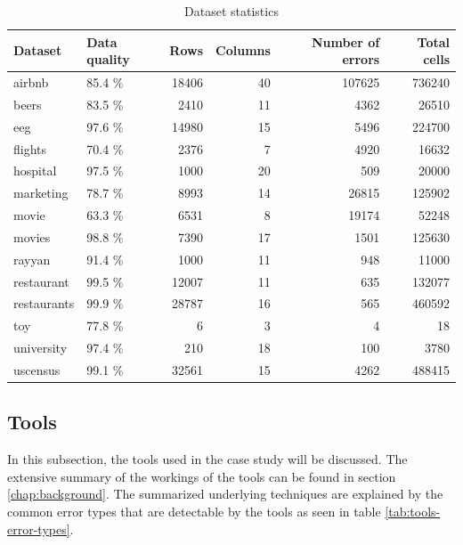 \begin{table}
\begin{tabular}{llrrrr}
\toprule
     Dataset & Data quality &   Rows &  Columns &  Number of errors &  Total cells \\
\midrule
      airbnb &       85.4 \% &  18406 &       40 &            107625 &       736240 \\
       beers &       83.5 \% &   2410 &       11 &              4362 &        26510 \\
         eeg &       97.6 \% &  14980 &       15 &              5496 &       224700 \\
     flights &       70.4 \% &   2376 &        7 &              4920 &        16632 \\
    hospital &       97.5 \% &   1000 &       20 &               509 &        20000 \\
   marketing &       78.7 \% &   8993 &       14 &             26815 &       125902 \\
       movie &       63.3 \% &   6531 &        8 &             19174 &        52248 \\
      movies &       98.8 \% &   7390 &       17 &              1501 &       125630 \\
      rayyan &       91.4 \% &   1000 &       11 &               948 &        11000 \\
  restaurant &       99.5 \% &  12007 &       11 &               635 &       132077 \\
 restaurants &       99.9 \% &  28787 &       16 &               565 &       460592 \\
         toy &       77.8 \% &      6 &        3 &                 4 &           18 \\
  university &       97.4 \% &    210 &       18 &               100 &         3780 \\
    uscensus &       99.1 \% &  32561 &       15 &              4262 &       488415 \\
\bottomrule
\end{tabular}
\caption{Dataset statistics}
\label{tab:dataset_statistics}
\end{table}

\subsection{Tools}
\label{subsec:tools}
In this subsection, the tools used in the case study will be discussed. The extensive summary of the workings of the tools can be found in section \ref{chap:background}. The summarized underlying techniques are explained by the common error types that are detectable by the tools as seen in table \ref{tab:tools-error-types}.


